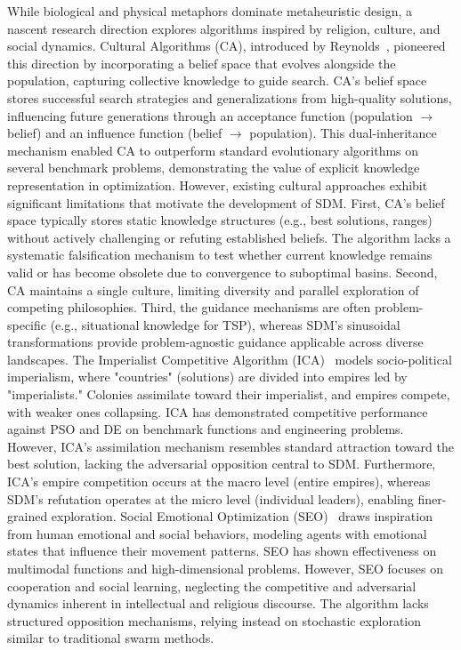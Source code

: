 \documentclass[11pt]{article}
\begin{document}
While biological and physical metaphors dominate metaheuristic design, a nascent research direction explores algorithms inspired by religion, culture, and social dynamics. Cultural Algorithms (CA), introduced by Reynolds~\citep{reynolds1994introduction}, pioneered this direction by incorporating a belief space that evolves alongside the population, capturing collective knowledge to guide search. CA's belief space stores successful search strategies and generalizations from high-quality solutions, influencing future generations through an acceptance function (population $\to$ belief) and an influence function (belief $\to$ population). This dual-inheritance mechanism enabled CA to outperform standard evolutionary algorithms on several benchmark problems, demonstrating the value of explicit knowledge representation in optimization.
However, existing cultural approaches exhibit significant limitations that motivate the development of SDM. First, CA's belief space typically stores static knowledge structures (e.g., best solutions, ranges) without actively challenging or refuting established beliefs. The algorithm lacks a systematic falsification mechanism to test whether current knowledge remains valid or has become obsolete due to convergence to suboptimal basins. Second, CA maintains a single culture, limiting diversity and parallel exploration of competing philosophies. Third, the guidance mechanisms are often problem-specific (e.g., situational knowledge for TSP), whereas SDM's sinusoidal transformations provide problem-agnostic guidance applicable across diverse landscapes.
The Imperialist Competitive Algorithm (ICA)~\citep{atashpaz2007imperialist} models socio-political imperialism, where "countries" (solutions) are divided into empires led by "imperialists." Colonies assimilate toward their imperialist, and empires compete, with weaker ones collapsing. ICA has demonstrated competitive performance against PSO and DE on benchmark functions and engineering problems. However, ICA's assimilation mechanism resembles standard attraction toward the best solution, lacking the adversarial opposition central to SDM. Furthermore, ICA's empire competition occurs at the macro level (entire empires), whereas SDM's refutation operates at the micro level (individual leaders), enabling finer-grained exploration.
Social Emotional Optimization (SEO)~\citep{xu2010social} draws inspiration from human emotional and social behaviors, modeling agents with emotional states that influence their movement patterns. SEO has shown effectiveness on multimodal functions and high-dimensional problems. However, SEO focuses on cooperation and social learning, neglecting the competitive and adversarial dynamics inherent in intellectual and religious discourse. The algorithm lacks structured opposition mechanisms, relying instead on stochastic exploration similar to traditional swarm methods.
\end{document}
